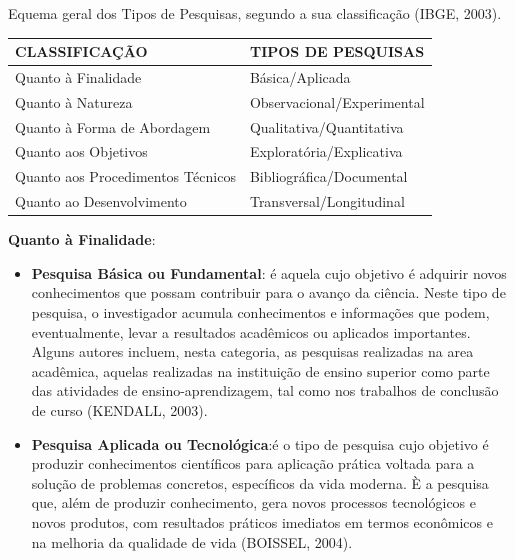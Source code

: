 \begin{quadro}[h!tp]
    \centering
    \caption{Equema geral dos Tipos de Pesquisas, segundo a sua classificação (IBGE, 2003).}
    \begin{tabular}{|l|l|}
    \hline \hline
    CLASSIFICAÇÃO                & TIPOS DE PESQUISAS   \\    
    \hline\hline
     Quanto à Finalidade         & Básica/Aplicada \\
     \hline
     Quanto à Natureza           & Observacional/Experimental  \\
     \hline
    Quanto à Forma de Abordagem  & Qualitativa/Quantitativa \\
    \hline
     Quanto aos Objetivos        & Exploratória/Explicativa \\
     \hline
    Quanto aos Procedimentos Técnicos     & Bibliográfica/Documental             \\
       \hline     
    Quanto ao Desenvolvimento    & Transversal/Longitudinal              \\
  \hline\hline
    \end{tabular}
\end{quadro}






\textbf{Quanto à Finalidade}: 

\begin{itemize}
\item \textbf{Pesquisa Básica ou Fundamental}: é aquela cujo objetivo é adquirir novos conhecimentos que possam contribuir para o avanço da ciência. Neste tipo de pesquisa, o investigador acumula conhecimentos e informações que podem, eventualmente, levar a resultados acadêmicos ou aplicados importantes. Alguns autores incluem, nesta categoria, as pesquisas realizadas na area acadêmica, aquelas realizadas na instituição de ensino superior como parte das atividades de ensino-aprendizagem, tal como nos trabalhos de conclusão de curso (KENDALL, 2003). 
\item \textbf{Pesquisa Aplicada ou Tecnológica}:é o tipo de pesquisa cujo objetivo é produzir conhecimentos científicos para aplicação prática voltada para a solução de problemas concretos, específicos da vida moderna. È a pesquisa que, além de produzir conhecimento, gera novos processos tecnológicos e novos produtos, com resultados práticos imediatos em termos econômicos e na melhoria da qualidade de vida (BOISSEL, 2004).
\end{itemize}


